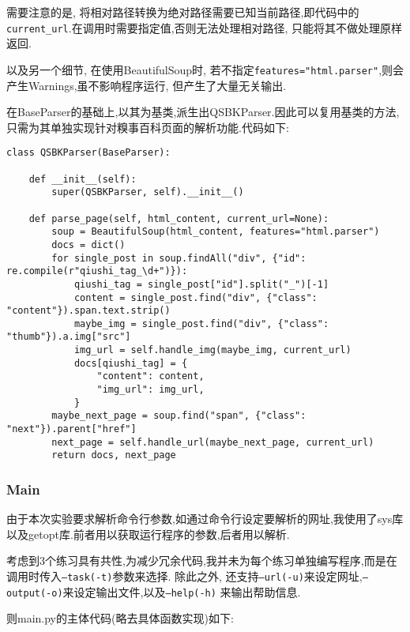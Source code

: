 \documentclass[a4paper]{article}
\begin{document}
需要注意的是, 将相对路径转换为绝对路径需要已知当前路径,即代码中的\texttt{current_url}.在调用时需要指定值,否则无法处理相对路径,
只能将其不做处理原样返回.

以及另一个细节, 在使用BeautifulSoup时, 若不指定\texttt{features="html.parser"},则会产生Warnings,虽不影响程序运行,
但产生了大量无关输出.

在BaseParser的基础上,以其为基类,派生出QSBKParser.因此可以复用基类的方法,只需为其单独实现针对糗事百科页面的解析功能.代码如下:
\begin{verbatim}
class QSBKParser(BaseParser):

    def __init__(self):
        super(QSBKParser, self).__init__()

    def parse_page(self, html_content, current_url=None):
        soup = BeautifulSoup(html_content, features="html.parser")
        docs = dict()
        for single_post in soup.findAll("div", {"id": re.compile(r"qiushi_tag_\d+")}):
            qiushi_tag = single_post["id"].split("_")[-1]
            content = single_post.find("div", {"class": "content"}).span.text.strip()
            maybe_img = single_post.find("div", {"class": "thumb"}).a.img["src"]
            img_url = self.handle_img(maybe_img, current_url)
            docs[qiushi_tag] = {
                "content": content,
                "img_url": img_url,
            }
        maybe_next_page = soup.find("span", {"class": "next"}).parent["href"]
        next_page = self.handle_url(maybe_next_page, current_url)
        return docs, next_page
\end{verbatim}
            \subsubsection{Main}
由于本次实验要求解析命令行参数,如通过命令行设定要解析的网址,我使用了sys库以及getopt库.前者用以获取运行程序的参数,后者用以解析.

考虑到3个练习具有共性,为减少冗余代码,我并未为每个练习单独编写程序,而是在调用时传入\texttt{--task(-t)}参数来选择. 除此之外,
还支持\texttt{--url(-u)}来设定网址,\texttt{--output(-o)}来设定输出文件,以及\texttt{--help(-h)}
来输出帮助信息.

则main.py的主体代码(略去具体函数实现)如下:
\end{document}
